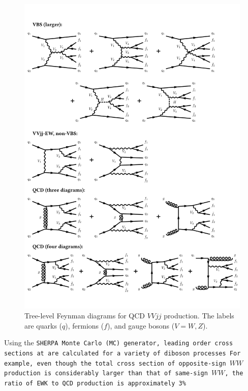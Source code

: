 \begin{figure}[htbp]
  \centering
    \includegraphics[width=\textwidth]{figs/ssww_13tev/diagrams/VbsQCD}
  \caption{Tree-level Feynman diagrams for QCD $VVjj$ production.  The labels are quarks ($q$), fermions ($f$), and gauge bosons ($V = W,Z$). }
  \label{fig:ssww13tev_diagrams_qcd}
\end{figure}

Using the \tt{SHERPA} Monte Carlo (MC) generator, leading order cross sections at  are calculated for a variety of diboson processes
For example, even though the total cross section of opposite-sign $WW$ production is considerably larger than that of same-sign $WW$, the ratio of EWK to QCD production is approximately 3\%

